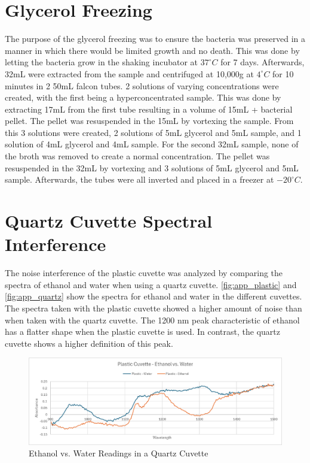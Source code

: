 \documentclass[12pt]{report}
\begin{document}
\section{Glycerol Freezing}
The purpose of the glycerol freezing was to ensure the bacteria was preserved in a manner in which there would be limited growth and no death. This was done by letting the bacteria grow in the shaking incubator at $37^{\circ}C$ for 7 days. Afterwards, 32mL were extracted from the sample and centrifuged at 10,000g at $4^{\circ}C$ for 10 minutes in 2 50mL falcon tubes. 2 solutions of varying concentrations were created, with the first being a hyperconcentrated sample. This was done by extracting 17mL from the first tube resulting in a volume of 15mL + bacterial pellet. The pellet was resuspended in the 15mL by vortexing the sample. From this 3 solutions were created, 2 solutions of 5mL glycerol and 5mL sample, and 1 solution of 4mL glycerol and 4mL sample. For the second 32mL sample, none of the broth was removed to create a normal concentration. The pellet was resuspended in the 32mL by vortexing and 3 solutions of 5mL glycerol and 5mL sample. Afterwards, the tubes were all inverted and placed in a freezer at $-20^{\circ}C$. 


\section{Quartz Cuvette Spectral Interference}
The noise interference of the plastic cuvette was analyzed by comparing the spectra of ethanol and water when using a quartz cuvette. \autoref{fig:app_plastic} and \autoref{fig:app_quartz} show the spectra for ethanol and water in the different cuvettes. The spectra taken with the plastic cuvette showed a higher amount of noise than when taken with the quartz cuvette. The 1200 nm peak characteristic of ethanol has a flatter shape when the plastic cuvette is used. In contrast, the quartz cuvette shows a higher definition of this peak.

\begin{figure}[!h]
    \centering
    \includegraphics[width=0.75\linewidth]{Images/plastic_ew.png}
    \caption{Ethanol vs. Water Readings in a Quartz Cuvette}
    \label{fig:app_plastic}
\end{figure}
\end{document}
